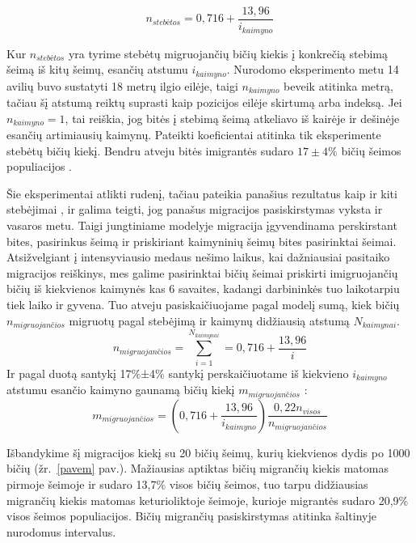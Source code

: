 \documentclass{VUMIFPSmagistrinis}
\begin{document}
\begin{equation}
    n_{steb\textit{\.{e}}tos} = 0,716 + \frac{13,96}{i_{kaimyno}}
\end{equation}



Kur $n_{steb\textit{\.{e}}tos}$ yra tyrime stebėtų migruojančių bičių kiekis į konkrečią stebimą šeimą iš kitų šeimų, esančių atstumu $i_{kaimyno}$. Nurodomo eksperimento metu 14 avilių buvo sustatyti 18 metrų ilgio eilėje, taigi $n_{kaimyno}$ beveik atitinka metrą, tačiau šį atstumą reiktų suprasti kaip pozicijos eilėje skirtumą arba indeksą. Jei $n_{kaimyno}=1$, tai reiškia, jog bitės į stebimą šeimą atkeliavo iš kairėje ir dešinėje esančių artimiausių kaimynų. Pateikti koeficientai atitinka tik eksperimente stebėtų bičių kiekį. Bendru atveju bitės imigrantės sudaro $17 ± 4\%$ bičių šeimos populiacijos \cite{BPC16}. 

Šie eksperimentai atlikti rudenį, tačiau pateikia panašius rezultatus kaip ir kiti stebėjimai \cite{PfC98, BPC16}, ir galima teigti, jog panašus migracijos pasiskirstymas vyksta ir vasaros metu. Taigi jungtiniame modelyje migracija įgyvendinama perskirstant bites, pasirinkus šeimą ir priskiriant kaimyninių šeimų bites pasirinktai šeimai. Atsižvelgiant į intensyviausio medaus nešimo laikus, kai dažniausiai pasitaiko migracijos reiškinys, mes galime pasirinktai bičių šeimai priskirti  imigruojančių bičių iš kiekvienos kaimynės kas 6 savaites, kadangi darbininkės tuo laikotarpiu tiek laiko ir gyvena. Tuo atveju pasiskaičiuojame pagal modelį sumą, kiek bičių $ n_{migruojan\textit{\v{c}}ios}$ migruotų pagal stebėjimą ir kaimynų didžiausią atstumą ${N_{kaimynai}}$.
\begin{equation}
    n_{migruojan\textit{\v{c}}ios} = \sum_{i=1}^{N_{kaimynai}} = 0,716 + \frac{13,96}{i}
\end{equation}
    Ir pagal duotą santykį 17\%±4\% santykį perskaičiuotame iš kiekvieno  $i_{kaimyno}$ atstumu esančio kaimyno gaunamą bičių kiekį $m_{migruojan\textit{\v{c}}ios}$ :
\begin{equation}   
    m_{migruojan\textit{\v{c}}ios} = (0,716 + \frac{13,96}{i_{kaimyno}}) \frac {0,22n_{visos}}{n_{migruojan\textit{\v{c}}ios}}
\end{equation}

Išbandykime šį migracijos kiekį su 20 bičių šeimų, kurių kiekvienos dydis po 1000 bičių (žr.~\ref{pavem} pav.). Mažiausias aptiktas bičių migrančių kiekis matomas pirmoje šeimoje ir sudaro 13,7\% visos bičių šeimos, tuo tarpu didžiausias migrančių kiekis matomas keturioliktoje šeimoje, kurioje migrantės sudaro 20,9\% visos šeimos populiacijos. Bičių migrančių pasiskirstymas atitinka šaltinyje nurodomus intervalus.
\end{document}

